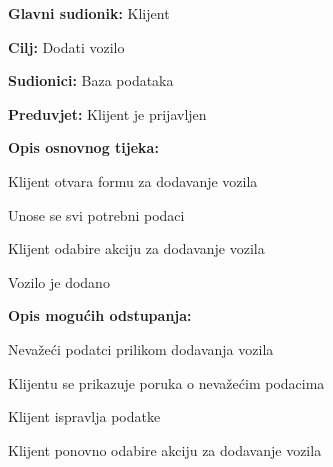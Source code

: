 \noindent {}
\begin{packed_item}

	\item \textbf{Glavni sudionik:} Klijent
	\item \textbf{Cilj:} Dodati vozilo
	\item \textbf{Sudionici:} Baza podataka
	\item \textbf{Preduvjet:} Klijent je prijavljen
	\item \textbf{Opis osnovnog tijeka:}
	
	\item[] \begin{packed_enum}
		
		\item Klijent otvara formu za dodavanje vozila
		\item Unose se svi potrebni podaci
		\item Klijent odabire akciju za dodavanje vozila
		\item Vozilo je dodano

	\end{packed_enum}
	
	\item  \textbf{Opis mogućih odstupanja:}
	
	\item[] \begin{packed_item}
		
		\item[6.a] Nevažeći podatci prilikom dodavanja vozila
		\item[] \begin{packed_enum}
			
			\item Klijentu se prikazuje poruka o nevažećim podacima
			\item Klijent ispravlja podatke
			\item Klijent ponovno odabire akciju za dodavanje vozila
			
		\end{packed_enum}
		
	\end{packed_item}
\end{packed_item}

